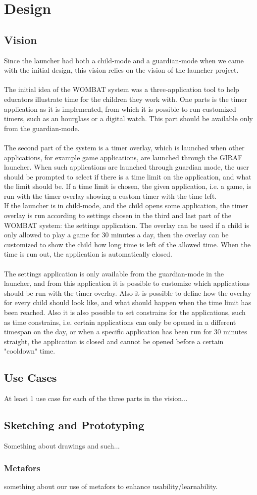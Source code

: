 \chapter{Design}


\section{Vision}
Since the launcher had both a child-mode and a guardian-mode when we came with the initial design, this vision relies on the vision of the launcher project.\\ \\
	The initial idea of the WOMBAT system was a three-application tool to help educators illustrate time for the children they work with. One parts is the timer application as it is implemented, from which it is possible to run customized timers, such as an hourglass or a digital watch. This part should be available only from the guardian-mode.\\ \\
  The second part of the system is a timer overlay, which is launched when other applications, for example game applications, are launched through the GIRAF launcher. When such applications are launched through guardian mode, the user should be prompted to select if there is a time limit on the application, and what the limit should be. If a time limit is chosen, the given application, i.e. a game, is run with the timer overlay showing a custom timer with the time left.\\
	If the launcher is in child-mode, and the child opens some application, the timer overlay is run according to settings chosen in the third and last part of the WOMBAT system: the settings application. The overlay can be used if a child is only allowed to play a game for 30 minutes a day, then the overlay can be customized to show the child how long time is left of the allowed time. When the time is run out, the application is automatically closed.\\ \\
	The settings application is only available from the guardian-mode in the launcher, and from this application it is possible to customize which applications should be run with the timer overlay. Also it is possible to define how the overlay for every child should look like, and what should happen when the time limit has been reached. Also it is also possible to set constrains for the applications, such as time constrains, i.e. certain applications can only be opened in a different timespan on the day, or when a specific application has been run for 30 minutes straight, the application is closed and cannot be opened before a certain "cooldown" time.

\section{Use Cases}
At least 1 use case for each of the three parts in the vision...

\section{Sketching and Prototyping}
Something about drawings and such...

\subsection{Metafors}
something about our use of metafors to enhance usability/learnability.